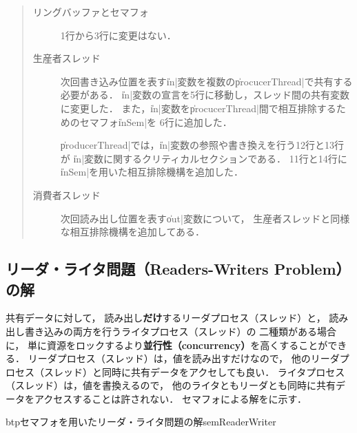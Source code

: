 \begin{quote}
\begin{description}
\item [リングバッファとセマフォ]
1行から3行に変更はない．

\item [生産者スレッド]
次回書き込み位置を表す\|in|変数を複数の\|procucerThread|で共有する必要がある．
\|in|変数の宣言を5行に移動し，スレッド間の共有変数に変更した．
また，\|in|変数を\|procucerThread|間で相互排除するためのセマフォ\|inSem|を
6行に追加した．

\|producerThread|では，\|in|変数の参照や書き換えを行う12行と13行が
\|in|変数に関するクリティカルセクションである．
11行と14行に\|inSem|を用いた相互排除機構を追加した．

\item [消費者スレッド]
次回読み出し位置を表す\|out|変数について，
生産者スレッドと同様な相互排除機構を追加してある．
\end{description}
\end{quote}

\subsection{リーダ・ライタ問題（Readers-Writers Problem）の解}
共有データに対して，
読み出し{\bf だけ}するリーダプロセス（スレッド）と，
読み出し書き込みの両方を行うライタプロセス（スレッド）の
二種類がある場合に，
単に資源をロックするより{\bf 並行性（concurrency）}を高くすることができる．
リーダプロセス（スレッド）は，値を読み出すだけなので，
他のリーダプロセス（スレッド）と同時に共有データをアクセしても良い．
ライタプロセス（スレッド）は，値を書換えるので，
他のライタともリーダとも同時に共有データをアクセスすることは許されない．
セマフォによる解をに示す．

\begin{myfig}{btp}{セマフォを用いたリーダ・ライタ問題の解}{semReaderWriter}

\end{myfig}


